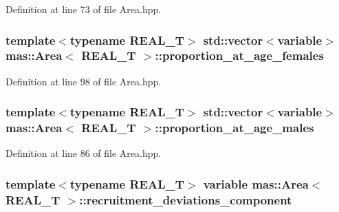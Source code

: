 Definition at line 73 of file Area.\-hpp.

\hypertarget{structmas_1_1_area_a169ca9a1c03c80c565ef1ca425078fad}{
\subsubsection[{proportion\-\_\-at\-\_\-age\-\_\-females}]{\setlength{\rightskip}{0pt plus 5cm}template$<$typename R\-E\-A\-L\-\_\-\-T$>$ std\-::vector$<${\bf variable}$>$ {\bf mas\-::\-Area}$<$ R\-E\-A\-L\-\_\-\-T $>$\-::proportion\-\_\-at\-\_\-age\-\_\-females}}\label{structmas_1_1_area_a169ca9a1c03c80c565ef1ca425078fad}


Definition at line 98 of file Area.\-hpp.

\hypertarget{structmas_1_1_area_ab5ddd76246ce29807ff2143e858b4907}{
\subsubsection[{proportion\-\_\-at\-\_\-age\-\_\-males}]{\setlength{\rightskip}{0pt plus 5cm}template$<$typename R\-E\-A\-L\-\_\-\-T$>$ std\-::vector$<${\bf variable}$>$ {\bf mas\-::\-Area}$<$ R\-E\-A\-L\-\_\-\-T $>$\-::proportion\-\_\-at\-\_\-age\-\_\-males}}\label{structmas_1_1_area_ab5ddd76246ce29807ff2143e858b4907}


Definition at line 86 of file Area.\-hpp.

\hypertarget{structmas_1_1_area_aaa231bd2abc74fef23bd8fcf4644236a}{
\subsubsection[{recruitment\-\_\-deviations\-\_\-component}]{\setlength{\rightskip}{0pt plus 5cm}template$<$typename R\-E\-A\-L\-\_\-\-T$>$ {\bf variable} {\bf mas\-::\-Area}$<$ R\-E\-A\-L\-\_\-\-T $>$\-::recruitment\-\_\-deviations\-\_\-component}}\label{structmas_1_1_area_aaa231bd2abc74fef23bd8fcf4644236a}


